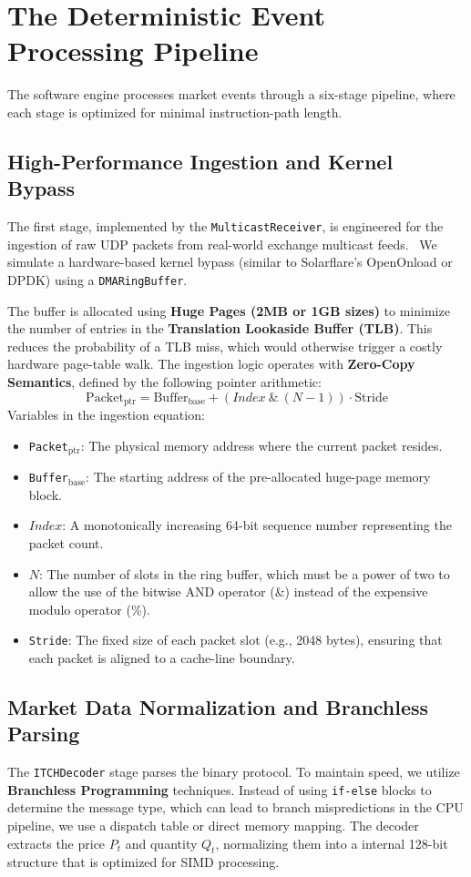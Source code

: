 \section{The Deterministic Event Processing Pipeline}
The software engine processes market events through a six-stage pipeline, where each stage is optimized for minimal instruction-path length.

\subsection{High-Performance Ingestion and Kernel Bypass}
The first stage, implemented by the \texttt{MulticastReceiver}, is engineered for the ingestion of raw UDP packets from real-world exchange multicast feeds. \datamethodology\ We simulate a hardware-based kernel bypass (similar to Solarflare's OpenOnload or DPDK) using a \texttt{DMARingBuffer}.

The buffer is allocated using \textbf{Huge Pages (2MB or 1GB sizes)} to minimize the number of entries in the \textbf{Translation Lookaside Buffer (TLB)}. This reduces the probability of a TLB miss, which would otherwise trigger a costly hardware page-table walk. The ingestion logic operates with \textbf{Zero-Copy Semantics}, defined by the following pointer arithmetic:
\begin{equation}
    \text{Packet}_{\text{ptr}} = \text{Buffer}_{\text{base}} + (Index \ \& \ (N - 1)) \cdot \text{Stride}
\end{equation}
Variables in the ingestion equation:
\begin{itemize}
    \item \texttt{Packet}$_{\text{ptr}}$: The physical memory address where the current packet resides.
    \item \texttt{Buffer}$_{\text{base}}$: The starting address of the pre-allocated huge-page memory block.
    \item $Index$: A monotonically increasing 64-bit sequence number representing the packet count.
    \item $N$: The number of slots in the ring buffer, which must be a power of two to allow the use of the bitwise AND operator (\&) instead of the expensive modulo operator (\%).
    \item \texttt{Stride}: The fixed size of each packet slot (e.g., 2048 bytes), ensuring that each packet is aligned to a cache-line boundary.
\end{itemize}

\subsection{Market Data Normalization and Branchless Parsing}
The \texttt{ITCHDecoder} stage parses the binary protocol. To maintain speed, we utilize \textbf{Branchless Programming} techniques. Instead of using \texttt{if-else} blocks to determine the message type, which can lead to branch mispredictions in the CPU pipeline, we use a dispatch table or direct memory mapping. The decoder extracts the price $P_t$ and quantity $Q_t$, normalizing them into a internal 128-bit structure that is optimized for SIMD processing.

